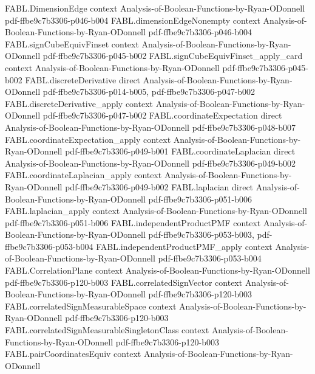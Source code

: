 \begin{theorem}
\proofstep
  {FABL.DimensionEdge}
  {context}
  {Analysis-of-Boolean-Functions-by-Ryan-ODonnell}
  {pdf-ffbe9c7b3306-p046-b004}
\proofstep
  {FABL.dimensionEdgeNonempty}
  {context}
  {Analysis-of-Boolean-Functions-by-Ryan-ODonnell}
  {pdf-ffbe9c7b3306-p046-b004}
\proofstep
  {FABL.signCubeEquivFinset}
  {context}
  {Analysis-of-Boolean-Functions-by-Ryan-ODonnell}
  {pdf-ffbe9c7b3306-p045-b002}
\proofstep
  {FABL.signCubeEquivFinset_apply_card}
  {context}
  {Analysis-of-Boolean-Functions-by-Ryan-ODonnell}
  {pdf-ffbe9c7b3306-p045-b002}
\proofstep
  {FABL.discreteDerivative}
  {direct}
  {Analysis-of-Boolean-Functions-by-Ryan-ODonnell}
  {pdf-ffbe9c7b3306-p014-b005,
    pdf-ffbe9c7b3306-p047-b002}
\proofstep
  {FABL.discreteDerivative_apply}
  {context}
  {Analysis-of-Boolean-Functions-by-Ryan-ODonnell}
  {pdf-ffbe9c7b3306-p047-b002}
\proofstep
  {FABL.coordinateExpectation}
  {direct}
  {Analysis-of-Boolean-Functions-by-Ryan-ODonnell}
  {pdf-ffbe9c7b3306-p048-b007}
\proofstep
  {FABL.coordinateExpectation_apply}
  {context}
  {Analysis-of-Boolean-Functions-by-Ryan-ODonnell}
  {pdf-ffbe9c7b3306-p049-b001}
\proofstep
  {FABL.coordinateLaplacian}
  {direct}
  {Analysis-of-Boolean-Functions-by-Ryan-ODonnell}
  {pdf-ffbe9c7b3306-p049-b002}
\proofstep
  {FABL.coordinateLaplacian_apply}
  {context}
  {Analysis-of-Boolean-Functions-by-Ryan-ODonnell}
  {pdf-ffbe9c7b3306-p049-b002}
\proofstep
  {FABL.laplacian}
  {direct}
  {Analysis-of-Boolean-Functions-by-Ryan-ODonnell}
  {pdf-ffbe9c7b3306-p051-b006}
\proofstep
  {FABL.laplacian_apply}
  {context}
  {Analysis-of-Boolean-Functions-by-Ryan-ODonnell}
  {pdf-ffbe9c7b3306-p051-b006}
\proofstep
  {FABL.independentProductPMF}
  {context}
  {Analysis-of-Boolean-Functions-by-Ryan-ODonnell}
  {pdf-ffbe9c7b3306-p053-b003,
    pdf-ffbe9c7b3306-p053-b004}
\proofstep
  {FABL.independentProductPMF_apply}
  {context}
  {Analysis-of-Boolean-Functions-by-Ryan-ODonnell}
  {pdf-ffbe9c7b3306-p053-b004}
\proofstep
  {FABL.CorrelationPlane}
  {context}
  {Analysis-of-Boolean-Functions-by-Ryan-ODonnell}
  {pdf-ffbe9c7b3306-p120-b003}
\proofstep
  {FABL.correlatedSignVector}
  {context}
  {Analysis-of-Boolean-Functions-by-Ryan-ODonnell}
  {pdf-ffbe9c7b3306-p120-b003}
\proofstep
  {FABL.correlatedSignMeasurableSpace}
  {context}
  {Analysis-of-Boolean-Functions-by-Ryan-ODonnell}
  {pdf-ffbe9c7b3306-p120-b003}
\proofstep
  {FABL.correlatedSignMeasurableSingletonClass}
  {context}
  {Analysis-of-Boolean-Functions-by-Ryan-ODonnell}
  {pdf-ffbe9c7b3306-p120-b003}
\proofstep
  {FABL.pairCoordinatesEquiv}
  {context}
  {Analysis-of-Boolean-Functions-by-Ryan-ODonnell}

\end{theorem}
